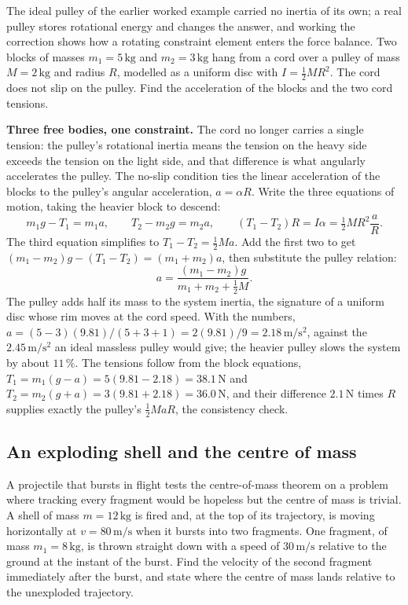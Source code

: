 The ideal pulley of the earlier worked example carried no inertia of its
own; a real pulley stores rotational energy and changes the answer, and
working the correction shows how a rotating constraint element enters the
force balance. Two blocks of masses $m_{1}=5\,\si{\kilogram}$ and
$m_{2}=3\,\si{\kilogram}$ hang from a cord over a pulley of mass $M=2\,
\si{\kilogram}$ and radius $R$, modelled as a uniform disc with
$I=\tfrac{1}{2}MR^{2}$. The cord does not slip on the pulley. Find the
acceleration of the blocks and the two cord tensions.

\textbf{Three free bodies, one constraint.} The cord no longer carries a
single tension: the pulley's rotational inertia means the tension on the
heavy side exceeds the tension on the light side, and that difference is
what angularly accelerates the pulley. The no-slip condition ties the
linear acceleration of the blocks to the pulley's angular acceleration,
$a=\alpha R$. Write the three equations of motion, taking the heavier
block to descend:
\[
m_{1}g-T_{1}=m_{1}a, \qquad
T_{2}-m_{2}g=m_{2}a, \qquad
(T_{1}-T_{2})R=I\alpha=\tfrac{1}{2}MR^{2}\frac{a}{R}.
\]
The third equation simplifies to $T_{1}-T_{2}=\tfrac{1}{2}Ma$. Add the
first two to get $(m_{1}-m_{2})g-(T_{1}-T_{2})=(m_{1}+m_{2})a$, then
substitute the pulley relation:
\[
a=\frac{(m_{1}-m_{2})g}{m_{1}+m_{2}+\tfrac{1}{2}M}.
\]
The pulley adds half its mass to the system inertia, the signature of a
uniform disc whose rim moves at the cord speed. With the numbers,
$a=(5-3)(9.81)/(5+3+1)=2(9.81)/9=2.18\,\si{\meter\per\second\squared}$,
against the $2.45\,\si{\meter\per\second\squared}$ an ideal massless
pulley would give; the heavier pulley slows the system by about
$11\,\%$. The tensions follow from the block equations, $T_{1}=m_{1}(g-a)
=5(9.81-2.18)=38.1\,\si{\newton}$ and $T_{2}=m_{2}(g+a)=3(9.81+2.18)=
36.0\,\si{\newton}$, and their difference $2.1\,\si{\newton}$ times $R$
supplies exactly the pulley's $\tfrac{1}{2}MaR$, the consistency check.

\subsection{An exploding shell and the centre of mass}

A projectile that bursts in flight tests the centre-of-mass theorem on a
problem where tracking every fragment would be hopeless but the centre
of mass is trivial. A shell of mass $m=12\,\si{\kilogram}$ is fired and,
at the top of its trajectory, is moving horizontally at $v=80\,\si{\meter
\per\second}$ when it bursts into two fragments. One fragment, of mass
$m_{1}=8\,\si{\kilogram}$, is thrown straight down with a speed of
$30\,\si{\meter\per\second}$ relative to the ground at the instant of the
burst. Find the velocity of the second fragment immediately after the
burst, and state where the centre of mass lands relative to the
unexploded trajectory.

